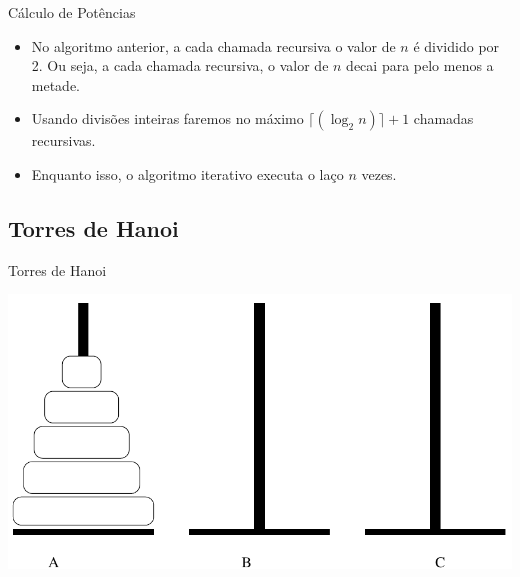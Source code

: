 \documentclass[handout]{beamer}
\begin{document}
\begin{frame}[fragile]{Cálculo de Potências}

    \begin{itemize}[<+->]
        \item No algoritmo anterior, a cada chamada recursiva o valor de $n$ é dividido por 2. Ou seja, a cada chamada recursiva, o valor de $n$ decai para pelo menos a metade.
        \item Usando divisões inteiras faremos no máximo $\lceil (\log_2 n) \rceil +1$ chamadas recursivas.
        \item Enquanto isso, o algoritmo iterativo executa o laço $n$ vezes.
    \end{itemize}
\end{frame}


\subsection{Torres de Hanoi}

\begin{frame}[fragile]{Torres de Hanoi}
    \begin{center}
        \includegraphics[width=\textwidth]{figs/hanoi}
    \end{center}
\end{frame}
\end{document}
